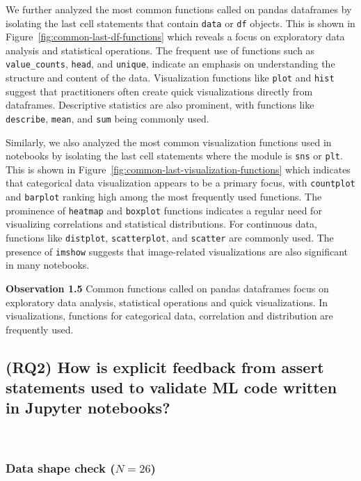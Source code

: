 \documentclass[journal]{IEEEtran}       %
\newcommand{\highlight}[1]{
  \begin{framed}%
    \noindent#1
\end{framed}}
\begin{document}
We further analyzed the most common functions called on pandas
dataframes by isolating the last cell statements that contain
\lstinline{data} or \lstinline{df} objects. This is shown in
Figure~\ref{fig:common-last-df-functions} which reveals a focus on
exploratory data analysis and statistical operations. The frequent
use of functions such as \lstinline{value_counts}, \lstinline{head},
and \lstinline{unique}, indicate an emphasis on understanding the
structure and content of the data. Visualization functions like
\lstinline{plot} and \lstinline{hist} suggest that practitioners
often create quick visualizations directly from dataframes.
Descriptive statistics are also prominent, with functions like
\lstinline{describe}, \lstinline{mean}, and \lstinline{sum} being commonly used.

Similarly, we also analyzed the most common visualization functions
used in notebooks by isolating the last cell statements where the
module is \lstinline{sns} or \lstinline{plt}. This is shown in
Figure~\ref{fig:common-last-visualization-functions} which indicates
that categorical data visualization appears to be a primary focus,
with \lstinline{countplot} and \lstinline{barplot} ranking high among
the most frequently used functions. The prominence of
\lstinline{heatmap} and \lstinline{boxplot} functions indicates a
regular need for visualizing correlations and statistical
distributions. For continuous data, functions like
\lstinline{distplot}, \lstinline{scatterplot}, and
\lstinline{scatter} are commonly used. The presence of
\lstinline{imshow} suggests that image-related visualizations are
also significant in many notebooks.

\highlight{\textbf{Observation 1.5} Common functions called on pandas
  dataframes focus on exploratory data analysis, statistical operations
  and quick visualizations. In visualizations, functions for
categorical data, correlation and distribution are frequently used.}

\subsection{(RQ2) How is explicit feedback from assert statements
  used to validate ML code written in Jupyter
notebooks?}~\label{sec:result-explicit}

\subsubsection{Data shape check ($N = 26$)}
\end{document}
